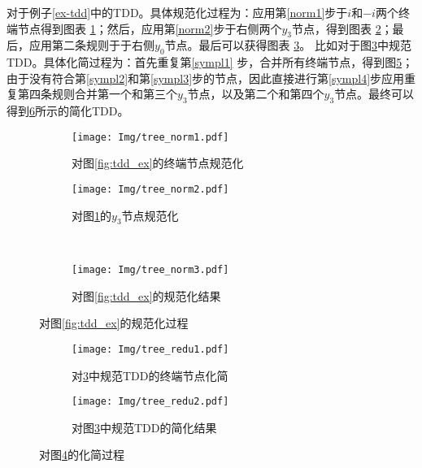 \begin{example}
    \label{ex-tdd-reduce}
    对于例子\ref{ex-tdd}中的TDD。具体规范化过程为：应用第\ref{norm1}步于$i$和$-i$两个终端节点得到图表 \ref{fig:tdd-norma}；然后，应用第\ref{norm2}步于右侧两个$y_3$节点，得到图表 \ref{fig:tdd-normb}；最后，应用第二条规则于于右侧$y_0$节点。最后可以获得图表 \ref{fig:tdd-normc}。
比如对于图\ref{fig:tdd-normc}中规范TDD。具体化简过程为：首先重复第\ref{sympl1} 步，合并所有终端节点，得到图\ref{fig:tdd-redu1}；由于没有符合第\ref{sympl2}和第\ref{sympl3}步的节点，因此直接进行第\ref{sympl4}步应用重复第四条规则合并第一个和第三个$y_3$节点，以及第二个和第四个$y_3$节点。最终可以得到\ref{fig:tdd-redu2}所示的简化TDD。
\begin{figure}[!htbp]
    \centering
    \begin{subfigure}[b]{0.4\textwidth}
        \centering
        \texttt{[image: Img/tree\_norm1.pdf]}
        \caption{对图\ref{fig:tdd_ex}的终端节点规范化}
        \label{fig:tdd-norma}
    \end{subfigure}
    \begin{subfigure}[b]{0.4\textwidth}
        \centering
        \texttt{[image: Img/tree\_norm2.pdf]}
        \caption{对图\ref{fig:tdd-norma}的$y_3$节点规范化}
        \label{fig:tdd-normb}
    \end{subfigure}
    \\
    \begin{subfigure}[b]{0.8\textwidth}
        \centering
        \texttt{[image: Img/tree\_norm3.pdf]}
        \caption{对图\ref{fig:tdd_ex}的规范化结果}
        \label{fig:tdd-normc}
    \end{subfigure}
    \caption{对图\ref{fig:tdd_ex}的规范化过程}
    \label{fig:tdd-norm}
\end{figure}
\begin{figure}[!htbp]
    \centering
    \begin{subfigure}[b]{0.4\textwidth}
        \centering
        \texttt{[image: Img/tree\_redu1.pdf]}
        \caption{对\ref{fig:tdd-normc}中规范TDD的终端节点化简}
        \label{fig:tdd-redu1}
    \end{subfigure}
    \begin{subfigure}[b]{0.4\textwidth}
        \centering
        \texttt{[image: Img/tree\_redu2.pdf]}
        \caption{对图\ref{fig:tdd-normc}中规范TDD的简化结果}
        \label{fig:tdd-redu2}
    \end{subfigure}
    \caption{对图\ref{fig:tdd-norm}的化简过程}
    \label{fig:tdd-redu}
\end{figure}
\end{example}

